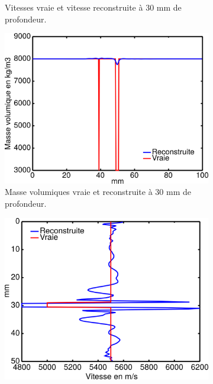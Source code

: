 \begin{figure}[!h]
\begin{changemargin}{-2cm}{-2cm}
\begin{subfigure}[b]{0.29\textwidth}
			\caption{Vitesses vraie et vitesse reconstruite à 30 mm de profondeur.}
		\end{subfigure}
		\begin{subfigure}[b]{0.29\textwidth}
			\caption{ }
		\end{subfigure}
		\begin{subfigure}[b]{0.29\textwidth}
			\includegraphics[width=\textwidth]{img/mono_param/coupe_rho_mono.png}
			\caption{Masse volumiques vraie et reconstruite à 30 mm de profondeur.}
		\end{subfigure}
				\begin{subfigure}[b]{0.29\textwidth}
			\includegraphics[width=\textwidth]{img/mono_param/coupe_vp_mono_vert.png}

\end{subfigure}
\end{changemargin}
\end{figure}
